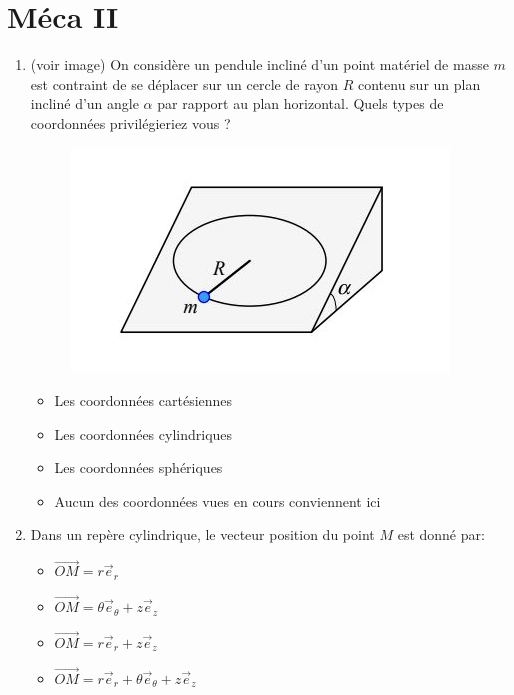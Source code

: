 \documentclass{article}
\begin{document}
    
\section{Méca II}

\begin{enumerate}


    \item (voir image) On considère un pendule incliné d'un point matériel de masse $m$ est contraint de se déplacer sur un cercle de rayon $R$ contenu sur un plan incliné d'un angle $\alpha$ par rapport au plan horizontal. Quels types de coordonnées privilégieriez vous ?
    \begin{figure}[H]
        \centering
        \includegraphics[]{Images/penduleincline.JPG}
        \label{fig:penduleincl}
    \end{figure}
    \begin{itemize}
        \item Les coordonnées cartésiennes
        \item Les coordonnées cylindriques %
        \item Les coordonnées sphériques
        \item Aucun des coordonnées vues en cours conviennent ici
    \end{itemize}
    
    \item Dans un repère cylindrique, le vecteur position du point $M$ est donné par:
    \begin{itemize}
        \item $\Vec{OM} = r \Vec{e}_r$
        \item $\Vec{OM} = \theta \Vec{e}_{\theta} + z \Vec{e}_z$
        \item $\Vec{OM} = r \Vec{e}_r + z \Vec{e}_z$ %
        \item $\Vec{OM} = r \Vec{e}_r + \theta \Vec{e}_{\theta} + z \Vec{e}_z$
        

\end{itemize}
\end{enumerate}
\end{document}
